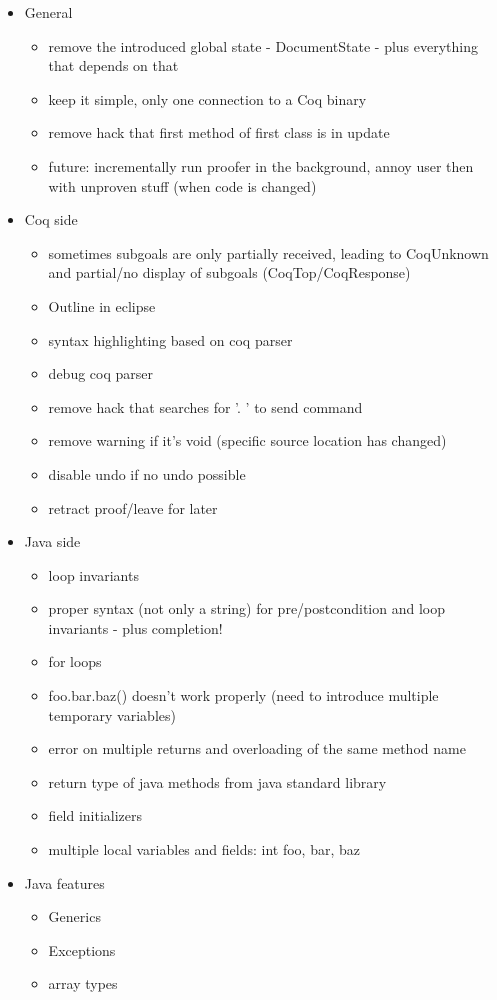 \documentclass{article}
\begin{document}
\begin{itemize}
\item General
\begin{itemize}
\item remove the introduced global state - DocumentState - plus everything that depends on that
\item keep it simple, only one connection to a Coq binary
\item remove hack that first method of first class is in update
\item future: incrementally run proofer in the background, annoy user then with unproven stuff (when code is changed)
\end{itemize}
\item Coq side
\begin{itemize}
\item sometimes subgoals are only partially received, leading to CoqUnknown and partial/no display of subgoals (CoqTop/CoqResponse)
\item Outline in eclipse
\item syntax highlighting based on coq parser
\item debug coq parser
\item remove hack that searches for '. ' to send command
\item remove warning if it's void (specific source location has changed)
\item disable undo if no undo possible
\item retract proof/leave for later
\end{itemize}
\item Java side
\begin{itemize}
\item loop invariants
\item proper syntax (not only a string) for pre/postcondition and loop invariants - plus completion!
\item for loops
\item foo.bar.baz() doesn't work properly (need to introduce multiple temporary variables)
\item error on multiple returns and overloading of the same method name
\item return type of java methods from java standard library
\item field initializers
\item multiple local variables and fields: int foo, bar, baz
\end{itemize}
\item Java features
\begin{itemize}
\item Generics
\item Exceptions
\item array types
\end{itemize}
\end{itemize}
\end{document}
